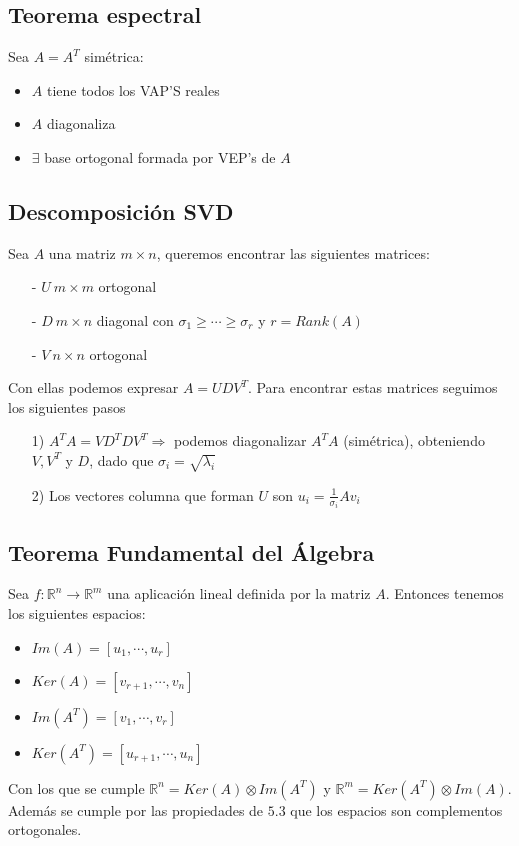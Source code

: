 \documentclass[12pt]{article}
\begin{document}
	\subsection{Teorema espectral}
	Sea $A=A^T$ simétrica:
	\begin{itemize}
		\item $A$ tiene todos los VAP'S reales 
		\item $A$ diagonaliza
		\item $\exists$ base ortogonal formada por VEP's de $A$
    \end{itemize}		
		
	\subsection{Descomposición SVD}
	Sea $A$ una matriz $m\times n$, queremos encontrar las siguientes matrices:
	\begin{itemize}
		\item[-] $U\ m\times m$ ortogonal
		\item[-] $D\ m\times n$ diagonal con $\sigma_1\geq \cdots \geq\sigma_r$ y $r=Rank(A)$
		\item[-] $V\ n\times n$ ortogonal		
	\end{itemize}
	Con ellas podemos expresar $A=UDV^T$. Para encontrar estas matrices seguimos los siguientes pasos
	\begin{itemize}
		\item[1)] $A^TA=VD^TDV^T \Rightarrow $ podemos diagonalizar $A^TA$ (simétrica), obteniendo $V, V^T$ y $D$, dado que $\sigma_i=\sqrt{\lambda_i}$
		\item[2)] Los vectores columna que forman $U$ son $u_i=\frac{1}{\sigma_i}Av_i$ 
		 
	\end{itemize}
	
	\subsection{Teorema Fundamental del Álgebra}
	Sea $f : \mathbb{R}^n \rightarrow \mathbb{R}^m$ una aplicación lineal definida por la matriz $A$. Entonces tenemos los siguientes espacios:
	\begin{itemize}
		\item $Im(A)=[u_1, \cdots , u_r]$
		\item $Ker(A)=[v_{r+1}, \cdots , v_n]$
		\item $Im(A^T)=[v_1, \cdots , v_r]$
		\item $Ker(A^T)=[u_{r+1}, \cdots , u_n]$
	\end{itemize}
	Con los que se cumple $\mathbb{R}^n=Ker(A)\otimes Im(A^T)$ y $\mathbb{R}^m=Ker(A^T)\otimes Im(A)$. \\
	Además se cumple por las propiedades de $5.3$ que los espacios son complementos ortogonales.
	
\end{document}
